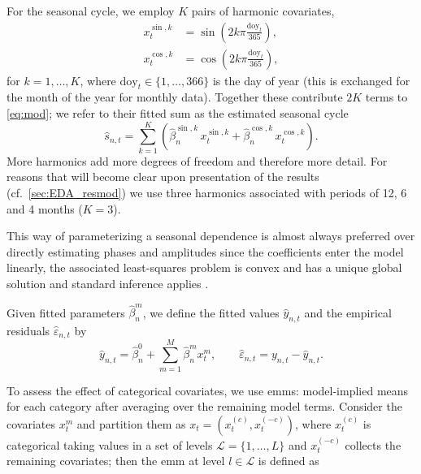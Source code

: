 For the seasonal cycle, we employ $K$ pairs of harmonic covariates,
\begin{align}
    x^{\sin,k}_t & = \sin\!\left(2k\pi \frac{\text{doy}_t}{365}\right), \\
    x^{\cos,k}_t & = \cos\!\left(2k\pi \frac{\text{doy}_t}{365}\right),
\end{align}
for $k = 1, \ldots, K$, where $\text{doy}_t \in \{1,\ldots,366\}$ is
the day of year (this is exchanged for the month of the year for monthly data). Together these contribute $2K$ terms to
\cref{eq:mod}; we refer to their fitted sum as the estimated
seasonal cycle
\begin{equation} \label{eq:seas}
    \hat{s}_{n,t} = \sum_{k=1}^{K} \left(
    \hat{\beta}_n^{\sin,k}\, x^{\sin,k}_t +
    \hat{\beta}_n^{\cos,k}\, x^{\cos,k}_t
    \right).
\end{equation}
More harmonics add more degrees of
freedom and therefore more detail. For reasons that will become clear
upon presentation of the results (cf.~\cref{sec:EDA_resmod}) we use
three harmonics associated with periods of 12, 6 and 4 months
($K = 3$).

This way of parameterizing a seasonal dependence is almost always preferred over directly estimating phases and amplitudes since the coefficients enter the model linearly, the associated least-squares problem is convex and has a unique global solution and standard inference applies \parencite{bloomfieldFittingSinusoids2000}.

Given fitted parameters  $\hat{\beta}_n^m$, we define the fitted values $\hat{y}_{n,t}$ and the empirical residuals $\hat{\varepsilon}_{n,t}$ by
\begin{equation} \label{eq:EmpRes}
    \hat{y}_{n,t} = \hat{\beta}^0_n + \sum_{m=1}^M \hat{\beta}^m_n x^m_t,
    \qquad
    \hat{\varepsilon}_{n,t} = y_{n,t}-\hat{y}_{n,t}.
\end{equation}

To assess the effect of categorical covariates, we use \glspl{emm}: model-implied means for each category after averaging over the remaining model terms. Consider the covariates $x_t^m$ and partition them as $x_t = (x^{(c)}_t, x^{(-c)}_t)$, where $x^{(c)}_t$ is categorical taking values in a set of levels $\mathcal{L} = \{1, \ldots, L\}$ and $x^{(-c)}_t$ collects the remaining covariates; then the \gls{emm} at level $l \in \mathcal{L}$ is defined as

